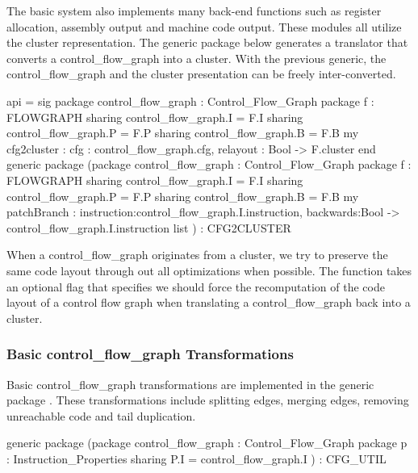 The basic \MLRISC{} system also implements many back-end functions
such as register allocation, assembly output and machine code output.
These modules all utilize the cluster representation.  The 
generic package  
below generates a translator
that converts a control_flow_graph into a cluster.  With the previous generic,
the control_flow_graph and the cluster presentation can be freely inter-converted.
\begin{SML}
 api  = sig
   package control_flow_graph : Control_Flow_Graph
   package f   : FLOWGRAPH
      sharing control_flow_graph.I = F.I
      sharing control_flow_graph.P = F.P
      sharing control_flow_graph.B = F.B
   my cfg2cluster : { cfg : control_flow_graph.cfg, relayout : Bool } -> F.cluster
 end 
 generic package 
   (package control_flow_graph  : Control_Flow_Graph
    package f    : FLOWGRAPH
       sharing control_flow_graph.I = F.I
       sharing control_flow_graph.P = F.P
       sharing control_flow_graph.B = F.B
    my patchBranch : {instruction:control_flow_graph.I.instruction, backwards:Bool} -> 
                         control_flow_graph.I.instruction list
   ) : CFG2CLUSTER
\end{SML}

When a control_flow_graph originates from a cluster, we try to preserve
the same code layout through out all optimizations when possible.
The function  takes an optional flag 
that specifies we should force the recomputation of
the code layout of a control flow graph when translating a control_flow_graph
back into a cluster.

\subsubsection{Basic control_flow_graph Transformations}

Basic control_flow_graph transformations are implemented in the generic package 
.  These transformations include splitting edges, merging
edges, removing unreachable code and tail duplication.
\begin{SML}
   generic package 
      (package control_flow_graph : Control_Flow_Graph
       package p   : Instruction_Properties
          sharing P.I = control_flow_graph.I
      ) : CFG_UTIL
\end{SML}

